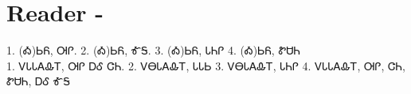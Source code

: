 \chapter{Reader -}
1. (Ꭳ)ᏏᏲ, ᎺᎵ. 2. (Ꭳ)ᏏᏲ, ᎹᎦ. 3. (Ꭳ)ᏏᏲ, ᏓᏂᎵ 4. (Ꭳ)ᏏᏲ, ᏑᏌᏂ 
\\
1. ᏙᏓᏓᎪᎲᎢ, ᎺᎵ ᎠᎴ ᏣᏂ. 2. ᏙᎾᏓᎪᎲᎢ, ᏓᏓᏏ 3. ᏙᎾᏓᎪᎲᎢ, ᏓᏂᎵ 4. ᏙᏓᏓᎪᎲᎢ, ᎺᎵ, ᏣᏂ, ᏑᏌᏂ, ᎠᎴ ᎹᎦ 
\\

